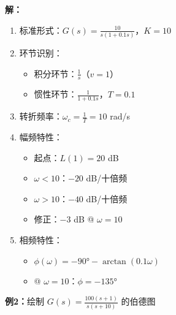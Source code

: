 \begin{tcolorbox}[colback=blue!5!white,colframe=blue!75!black,title=例1求解过程与伯德图]

\begin{minipage}[t]{0.47\textwidth}
\textbf{解：}
\begin{enumerate}
    \item 标准形式：$G(s) = \frac{10}{s(1+0.1s)}$，$K = 10$
    \item 环节识别：
    \begin{itemize}
        \item 积分环节：$\frac{1}{s}$（$v=1$）
        \item 惯性环节：$\frac{1}{1+0.1s}$，$T=0.1$
    \end{itemize}
    \item 转折频率：$\omega_c = \frac{1}{T} = 10$ rad/s
    \item 幅频特性：
    \begin{itemize}
        \item 起点：$L(1) = 20$ dB
        \item $\omega < 10$：$-20$ dB/十倍频
        \item $\omega > 10$：$-40$ dB/十倍频
        \item 修正：$-3$ dB @ $\omega=10$
    \end{itemize}
    \item 相频特性：
    \begin{itemize}
        \item $\phi(\omega) = -90° - \arctan(0.1\omega)$
        \item @ $\omega = 10$：$\phi = -135°$
    \end{itemize}
\end{enumerate}
\end{minipage}\hfill
\begin{minipage}[t]{0.47\textwidth}
\end{minipage}

\end{tcolorbox}

\textbf{例2：}绘制 $G(s) = \frac{100(s+1)}{s(s+10)}$ 的伯德图

